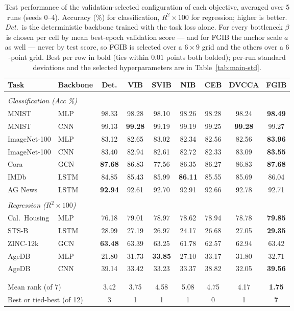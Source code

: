\begin{table}[t]
\caption{Test performance of the validation-selected configuration of each objective, averaged over 5 runs (seeds 0--4). Accuracy (\%) for classification, $R^2\times100$ for regression; higher is better. \emph{Det.}\ is the deterministic backbone trained with the task loss alone. For every bottleneck $\beta$ is chosen per cell by mean best-epoch validation score --- and for FGIB the anchor scale $a$ as well --- never by test score, so FGIB is selected over a $6\times9$ grid and the others over a $6$-point grid. Best per row in bold (ties within $0.01$ points both bolded); per-run standard deviations and the selected hyperparameters are in Table~\ref{tab:main-std}.}
\label{tab:main}
\begin{center}\small
\begin{tabular}{llccccccc}
Task & Backbone & Det. & VIB & SVIB & NIB & CEB & DVCCA & \textbf{FGIB} \\ \hline \\[-1.8ex]
\multicolumn{9}{l}{\emph{Classification (Acc \%)}} \\[0.3ex]
MNIST & MLP & 98.33 & 98.28 & 98.10 & 98.26 & 98.28 & 98.24 & \textbf{98.49} \\
MNIST & CNN & 99.13 & \textbf{99.28} & 99.19 & 99.19 & 99.25 & \textbf{99.28} & 99.27 \\
ImageNet-100 & MLP & 83.12 & 82.65 & 83.02 & 82.34 & 82.56 & 82.56 & \textbf{83.96} \\
ImageNet-100 & CNN & 83.40 & 82.94 & 82.61 & 82.72 & 82.33 & 83.09 & \textbf{83.55} \\
Cora & GCN & \textbf{87.68} & 86.83 & 77.56 & 86.35 & 86.27 & 86.83 & \textbf{87.68} \\
IMDb & LSTM & 84.85 & 85.43 & 85.99 & \textbf{86.11} & 85.55 & 85.69 & 86.04 \\
AG News & LSTM & \textbf{92.94} & 92.61 & 92.70 & 92.91 & 92.66 & 92.78 & 92.71 \\
\\[-1.5ex]
\multicolumn{9}{l}{\emph{Regression ($R^2\times100$)}} \\[0.3ex]
Cal.\ Housing & MLP & 76.18 & 79.01 & 78.97 & 78.62 & 78.94 & 78.78 & \textbf{79.85} \\
STS-B & LSTM & 28.99 & 27.19 & 26.97 & 24.17 & 26.68 & 27.05 & \textbf{29.35} \\
ZINC-12k & GCN & \textbf{63.48} & 63.39 & 63.25 & 61.78 & 62.57 & 62.94 & 63.42 \\
AgeDB & MLP & 21.80 & 31.73 & \textbf{33.85} & 27.10 & 33.17 & 31.80 & 32.71 \\
AgeDB & CNN & 39.14 & 33.42 & 33.23 & 33.37 & 38.82 & 32.05 & \textbf{39.56} \\
\\[-1.5ex]
\hline \\[-1.8ex]
\multicolumn{2}{l}{Mean rank (of 7)} & 3.42 & 3.75 & 4.58 & 5.08 & 4.75 & 4.17 & \textbf{1.75} \\
\multicolumn{2}{l}{Best or tied-best (of 12)} & 3 & 1 & 1 & 1 & 0 & 1 & \textbf{7} \\
\end{tabular}\end{center}\end{table}
